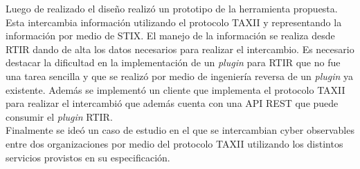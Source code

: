 \bigskip
Luego de realizado el diseño realizó un prototipo de la herramienta propuesta. Esta intercambia información utilizando el protocolo TAXII y representando la información por medio de STIX. El manejo de la información se realiza desde RTIR dando de alta los datos necesarios para realizar el intercambio. Es necesario destacar la dificultad en la implementación de un \textit{plugin} para RTIR que no fue una tarea sencilla y que se realizó por medio de ingeniería reversa de un \textit{plugin} ya existente. Además se implementó un cliente que implementa el protocolo TAXII para realizar el intercambió que además cuenta con una API REST que puede consumir el \textit{plugin} RTIR.\\
\bigskip
Finalmente se ideó un caso de estudio en el que se intercambian cyber observables entre dos organizaciones por medio del protocolo TAXII utilizando los distintos servicios provistos en su especificación.
